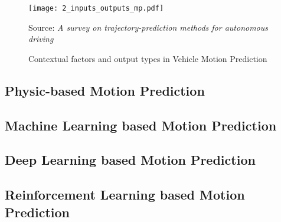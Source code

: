 \begin{figure}[h]
	\centering
	\texttt{[image: 2\_inputs\_outputs\_mp.pdf]}
	\caption{Contextual factors and output types in Vehicle Motion Prediction}
	Source: \textit{A survey on trajectory-prediction methods for autonomous driving} \cite{huang2022survey}
	\label{fig:2_input_output_map}
\end{figure}

\subsection{Physic-based Motion Prediction}
\label{sec:2_physic_based_mp}

\subsection{Machine Learning based Motion Prediction}
\label{sec:2_ml_based_mp}

\subsection{Deep Learning based Motion Prediction}
\label{sec:2_dl_based_mp}

\subsection{Reinforcement Learning based Motion Prediction}
\label{sec:2_rl_based_mp}


